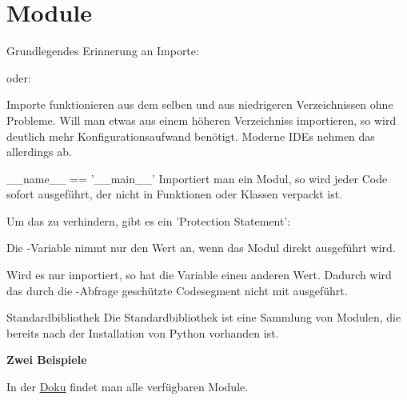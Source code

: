 \section{Module}
\begin{frame}{Grundlegendes}
	Erinnerung an Importe:
	
	oder:
	
	Importe funktionieren aus dem selben und aus niedrigeren Verzeichnissen ohne Probleme. Will man etwas aus einem höheren Verzeichniss importieren, so wird deutlich mehr Konfigurationsaufwand benötigt. Moderne IDEs nehmen das allerdings ab.	
\end{frame}

\begin{frame}{\_\_name\_\_ == '\_\_main\_\_'}
	Importiert man ein Modul, so wird jeder Code sofort ausgeführt, der nicht in Funktionen oder Klassen verpackt ist.
	
	Um das zu verhindern, gibt es ein 'Protection Statement':
	
	Die -Variable nimmt nur den Wert  an, wenn das Modul direkt ausgeführt wird. 
	
	Wird es nur importiert, so hat die Variable einen anderen Wert. Dadurch wird das durch die -Abfrage geschützte Codesegment nicht mit ausgeführt.
\end{frame}

\begin{frame}{Standardbibliothek}
	Die Standardbibliothek ist eine Sammlung von Modulen, die bereits nach der Installation von Python vorhanden ist.
	
	\textbf{Zwei Beispiele}
	
	
	
	In der \alert{\href{https://docs.python.org/3/library/}{Doku}} findet man alle verfügbaren Module.
\end{frame}

